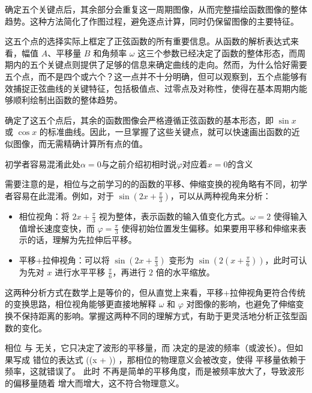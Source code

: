 确定五个关键点后，其余部分会重复这一周期图像，从而完整描绘函数图像的整体趋势。这种方法简化了作图过程，避免逐点计算，同时仍保留图像的主要特征。



这五个点的选择实际上框定了正弦函数的所有重要信息。从函数的解析表达式来看，幅值 $A$、平移量 $B$ 和角频率 $\omega$ 这三个参数已经决定了函数的整体形态，而周期内的五个关键点则提供了足够的信息来确定曲线的走向。然而，为什么恰好需要五个点，而不是四个或六个？这一点并不十分明确，但可以观察到，五个点能够有效捕捉正弦曲线的关键特征，包括极值点、过零点及对称性，使得在基本周期内能够顺利绘制出函数的整体趋势。

确定了这五个点后，其余的函数图像会严格遵循正弦函数的基本形态，即 $\sin x$ 或 $\cos x$ 的标准曲线。因此，一旦掌握了这些关键点，就可以快速画出函数的近似图像，而无需精确计算所有点的值。





初学者容易混淆此处$\alpha=0$与之前介绍初相时说$\varphi$对应着$x=0$的含义


需要注意的是，相位与之前学习的的函数的平移、伸缩变换的视角略有不同，初学者容易在此混淆。例如，对于 $\displaystyle\sin(2x + \frac{\pi}{3})$，可以从两种视角来分析：
\begin{itemize}
\item 相位视角：将 $\displaystyle2x + \frac{\pi}{3}$ 视为整体，表示函数的输入值变化方式。$\omega = 2$ 使得输入值增长速度变快，而 $\displaystyle\varphi = \frac{\pi}{3}$ 使得初始位置发生偏移。如果要用平移和伸缩来表示的话，理解为先拉伸后平移。
\item 平移+拉伸视角：可以将 $\displaystyle\sin(2x + \frac{\pi}{3})$ 变形为 $\displaystyle\sin\left(2(x + \frac{\pi}{6})\right)$，此时可认为先对 $x$ 进行水平平移 $\displaystyle\frac{\pi}{6}$，再进行 $2$ 倍的水平缩放。
\end{itemize}

这两种分析方式在数学上是等价的，但从直觉上来看，平移+拉伸视角更符合传统的变换思路，相位视角能够更直接地解释 $\omega$ 和 $\varphi$ 对图像的影响，也避免了伸缩变换不保持距离的影响。掌握这两种不同的理解方式，有助于更灵活地分析正弦型函数的变化。

相位  \phi  与  \omega  无关，它只决定了波形的平移量，而  \omega  决定的是波的频率（或波长）。但如果写成 错位的表达式  \sin(\omega(x + \phi)) ，那相位的物理意义会被改变，使得 平移量依赖于频率，这就错误了。
此时  \phi  不再是简单的平移角度，而是被频率放大了，导致波形的偏移量随着  \omega  增大而增大，这不符合物理意义。


